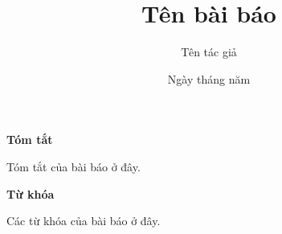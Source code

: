 \documentclass{article}
\title{Tên bài báo}
\author{Tên tác giả}
\date{Ngày tháng năm}
\begin{document}
\begin{titlingpage}
\maketitle
\begin{center}
\textbf{Tóm tắt}
\end{center}
Tóm tắt của bài báo ở đây.
\begin{center}
\textbf{Từ khóa}
\end{center}
Các từ khóa của bài báo ở đây.

\end{titlingpage}
\end{document}
